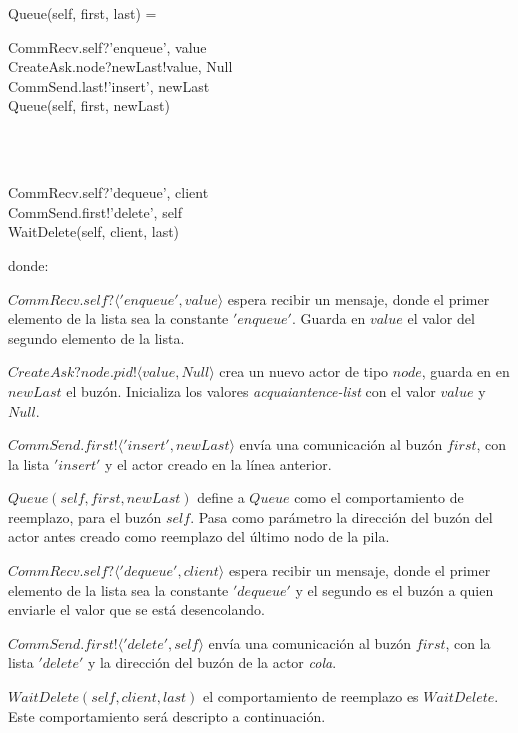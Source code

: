 \begin{process}
Queue(self, first, last) = \\ \quad
  \begin{block}
  CommRecv.self?\langle 'enqueue', value \rangle \then \\
  CreateAsk.node?newLast!\langle value, Null \rangle \then \\
  CommSend.last!\langle 'insert', newLast \rangle \then \\
  Queue(self, first, newLast)
  \end{block} \\

  \Extchoice \\ \quad
  
  \begin{block}
  CommRecv.self?\langle 'dequeue', client \rangle \then \\
  CommSend.first!\langle 'delete', self \rangle \then \\
  WaitDelete(self, client, last)
  \end{block} 
\end{process}
donde:
\begin{description}
 \item $CommRecv.self? \langle 'enqueue', value \rangle$ espera recibir un mensaje, donde el primer elemento de la lista sea la constante $'enqueue'$. Guarda en $value$ el valor del segundo elemento de la lista.
 \item $CreateAsk?node.pid!\langle value, Null \rangle$ crea un nuevo actor de tipo $node$, guarda en en $newLast$ el buzón. Inicializa los valores \textit{acquaiantence-list} con el valor $value$ y $Null$.
 \item $CommSend.first!\langle 'insert', newLast \rangle$ envía una comunicación al buzón $first$, con la lista $'insert'$ y el actor creado en la línea anterior. 
 \item $Queue(self, first, newLast)$ define a $Queue$ como el comportamiento de reemplazo, para el buzón $self$. Pasa como parámetro la dirección del buzón del actor antes creado como reemplazo del último nodo de la pila.
 \item $CommRecv.self?\langle 'dequeue', client \rangle$ espera recibir un mensaje, donde el primer elemento de la lista sea la constante $'dequeue'$ y el segundo es el buzón a quien enviarle el valor que se está desencolando.
 \item $CommSend.first!\langle 'delete', self \rangle$ envía una comunicación al buzón $first$, con la lista $'delete'$ y la dirección del buzón de la actor \textit{cola}. 
 \item $WaitDelete(self, client, last)$ el comportamiento de reemplazo es $WaitDelete$. Este comportamiento será descripto a continuación.
 \end{description}

